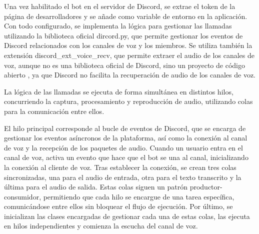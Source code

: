         Una vez habilitado el bot en el servidor de Discord, se extrae el token de la página de desarrolladores y se añade como variable de entorno en la aplicación.
        Con todo configurado, se implementa la lógica para gestionar las llamadas utilizando la biblioteca oficial dircord.py, que permite gestionar los eventos de Discord relacionados con los canales de voz y los miembros. 
        Se utiliza también la extensión discord\_ext\_voice\_recv, que permite extraer el audio de los canales de voz, aunque no es una biblioteca oficial de Discord, sino un proyecto de código abierto \cite{ref16}, ya que Discord no facilita la recuperación de audio de los canales de voz. 

        La lógica de las llamadas se ejecuta de forma simultánea en distintos hilos, concurriendo la captura, procesamiento y reproducción de audio, utilizando colas para la comunicación entre ellos. 
        
        El hilo principal corresponde al bucle de eventos de Discord, que se encarga de gestionar los eventos asíncronos de la plataforma, así como la conexión al canal de voz y la recepción de los paquetes de audio. 
        Cuando un usuario entra en el canal de voz, activa un evento que hace que el bot se una al canal, inicializando la conexión al cliente de voz. 
        Tras establecer la conexión, se crean tres colas sincronizadas, una para el audio de entrada, otra para el texto transcrito y la última para el audio de salida. 
        Estas colas siguen un patrón productor-consumidor, permitiendo que cada hilo se encargue de una tarea específica, comunicándose entre ellos sin bloquear el flujo de ejecución. 
        Por último, se inicializan las clases encargadas de gestionar cada una de estas colas, las ejecuta en hilos independientes y comienza la escucha del canal de voz. 

